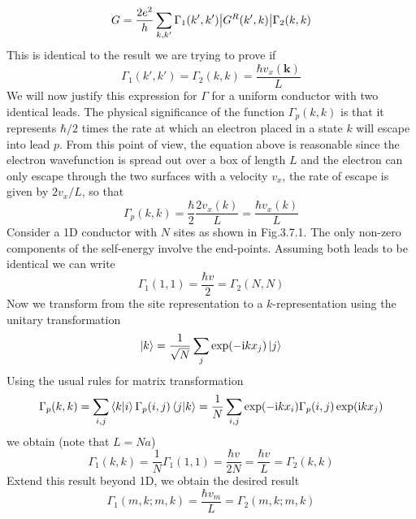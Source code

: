 \documentclass[11pt,a4paper]{book}
\theoremstyle{plain}
\theoremstyle{definition}
\theoremstyle{remark}
\newcommand{\ii}{\mathrm{i}}                      %
\renewcommand{\vec}[1]{\boldsymbol{#1}}
\begin{document}
\begin{equation}
    G = \frac{2 e^2}{h} \sum_{k,k'} \Gamma_1(k',k') \abs{G^R(k',k)} \Gamma_2(k,k)
\end{equation}
This is identical to the result we are trying to prove if 
\begin{equation}
    \Gamma_1(k',k') = \Gamma_2(k,k) = \frac{\hbar v_x(\vec{k})}{L}
\end{equation}
We will now justify this expression for $\Gamma$ for a uniform conductor with two identical leads. The physical significance of the function $\Gamma_p(k,k)$ is that it represents $\hbar/2$ times the rate at which an electron placed in a state $k$ will escape into lead $p$. From this point of view, the equation above is reasonable since the electron wavefunction is spread out over a box of length $L$ and the electron can only escape through the two surfaces with a velocity $v_x$, the rate of escape is given by $2 v_x/L$, so that 
\begin{equation}
    \Gamma_p(k,k) = \frac{\hbar}{2} \frac{2 v_x(k)}{L} = \frac{\hbar v_x(k)}{L}
\end{equation}
Consider a 1D conductor with $N$ sites as shown in Fig.3.7.1. The only non-zero components of the self-energy involve the end-points. Assuming both leads to be identical we can write
\begin{equation}
    \Gamma_1(1,1) = \frac{\hbar v}{2} = \Gamma_2(N,N)
\end{equation}
Now we transform from the site representation to a $k$-representation using the unitary transformation
\begin{equation}
    \ket{k} = \frac{1}{\sqrt{N}} \sum_j \exp(-\ii k x_j) \ket{j}
\end{equation}
Using the usual rules for matrix transformation
\begin{equation}
    \Gamma_p(k,k) = \sum_{i,j} \braket{k|i} \Gamma_p(i,j) \braket{j|k} = \frac{1}{N} \sum_{i,j} \exp(-\ii k x_i) \Gamma_p(i,j) \exp(\ii k x_j)
\end{equation}
we obtain (note that $L = Na$)
\begin{equation}
    \Gamma_1(k,k) = \frac{1}{N} \Gamma_1(1,1) = \frac{\hbar v}{2 N} = \frac{\hbar v}{L} = \Gamma_2(k,k)
\end{equation}
Extend this result beyond 1D, we obtain the desired result
\begin{equation}
    \Gamma_1(m,k;m,k) = \frac{\hbar v_m}{L} = \Gamma_2(m,k;m,k)
\end{equation}
\end{document}
